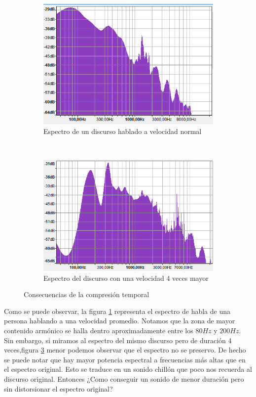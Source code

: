 \begin{figure}[H]
	\centering
	\begin{subfigure}[b]{0.4\linewidth}
		\centering
		\includegraphics[scale=0.5]{ImagenesEjercicio5/HumanSpeechNormalSpeed.PNG}
		\caption{Espectro de un discurso hablado a velocidad normal}
		\label{fig:speechNormal}
	\end{subfigure}
	~
	\begin{subfigure}[b]{0.4\linewidth}
		\centering
		\includegraphics[scale=0.5]{ImagenesEjercicio5/HumanSpeech4X.PNG}
		\caption{Espectro del discurso con una velocidad 4 veces mayor}
		\label{fig:speech4X}
	\end{subfigure}
	\caption{Consecuencias de la compresión temporal}
\end{figure}

Como se puede observar, la figura \ref{fig:speechNormal} representa el espectro de habla de una persona hablando a una velocidad promedio. Notamos que la zona de mayor contenido armónico se halla dentro aproximadamente entre los $80Hz$ y $200Hz$. Sin embargo, si miramos al espectro del mismo discurso pero de duración 4 veces,figura \ref{fig:speech4X} menor podemos observar que el espectro no se preservo. De hecho se puede notar que hay mayor potencia espectral a frecuencias más altas que en el espectro original. Esto se traduce en un sonido chillón que poco nos recuerda al discurso original. Entonces ¿Como conseguir un sonido de menor duración pero sin distorsionar el espectro original?


